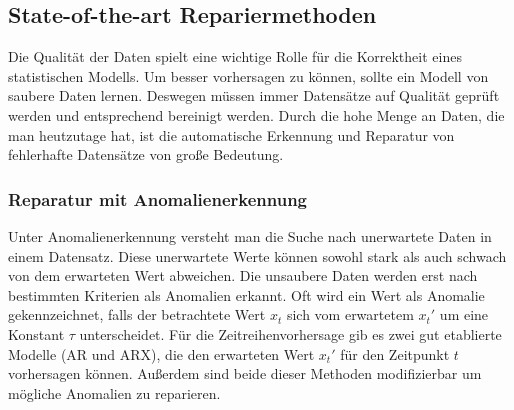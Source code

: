 \subsection{State-of-the-art Repariermethoden}
Die Qualität der Daten spielt eine wichtige Rolle für die Korrektheit
eines statistischen Modells. Um besser vorhersagen zu können, sollte ein Modell
von saubere Daten lernen. Deswegen müssen immer Datensätze auf Qualität geprüft
werden und entsprechend bereinigt werden. Durch die hohe Menge an Daten, die
man heutzutage hat, ist die automatische Erkennung und Reparatur von
fehlerhafte Datensätze von große Bedeutung.

\subsubsection{Reparatur mit Anomalienerkennung}\label{sec:anomalienerkennung}
Unter Anomalienerkennung versteht man die Suche nach unerwartete Daten in einem
Datensatz. Diese unerwartete Werte können sowohl stark als auch schwach von dem
erwarteten Wert abweichen. Die unsaubere Daten werden erst nach bestimmten
Kriterien als Anomalien erkannt. Oft wird ein Wert als Anomalie gekennzeichnet,
falls der betrachtete Wert $x_t$ sich vom erwartetem $x_t'$ um eine Konstant
$\tau$ unterscheidet. Für die Zeitreihenvorhersage gib es zwei gut etablierte
Modelle (AR und ARX), die den erwarteten Wert $x_t'$ für den Zeitpunkt $t$ vorhersagen
können. Außerdem sind beide dieser Methoden modifizierbar um mögliche Anomalien
zu reparieren.
